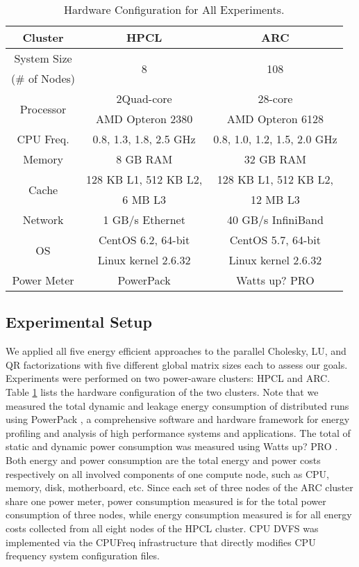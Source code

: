 \documentclass[12pt]{elsarticle}
\begin{document}
\begin{table}[h]
\scriptsize \centering
\caption{Hardware Configuration for All Experiments.}
\label{hardware_configuration}
\begin{tabular}{|c|c|c|}
\hline
Cluster & HPCL & ARC\\
\hline
System Size & \multirow{2}{*}{8} & \multirow{2}{*}{108}\\
(\# of Nodes) & &\\
\hline
\multirow{2}{*}{Processor} & 2Quad-core & 28-core\\
& AMD Opteron 2380 & AMD Opteron 6128\\
\hline
CPU Freq. & 0.8, 1.3, 1.8, 2.5 GHz & 0.8, 1.0, 1.2, 1.5, 2.0 GHz\\
\hline
Memory & 8 GB RAM & 32 GB RAM\\
\hline
\multirow{2}{*}{Cache} & 128 KB L1, 512 KB L2, & 128 KB L1, 512 KB L2,\\
& 6 MB L3 & 12 MB L3\\
\hline
Network & 1 GB/s Ethernet & 40 GB/s InfiniBand\\
\hline
\multirow{2}{*}{OS} & CentOS 6.2, 64-bit & CentOS 5.7, 64-bit\\
& Linux kernel 2.6.32 & Linux kernel 2.6.32\\
\hline
Power Meter & PowerPack & Watts up? PRO\\
\hline
\end{tabular}
\normalsize
\end{table}

\subsection{Experimental Setup}

We applied all five energy efficient approaches to the parallel Cholesky, LU, and QR factorizations with five different global matrix sizes each to assess our goals. Experiments were performed on two power-aware clusters: HPCL and ARC. Table \ref{hardware_configuration} lists the hardware configuration of the two clusters. Note that we measured the total dynamic and leakage energy consumption of distributed runs using PowerPack \cite{tpds10}, a comprehensive software and hardware framework for energy profiling and analysis of high performance systems and applications. The total of static and dynamic power consumption was measured using Watts up? PRO \cite{wattsup}. Both energy and power consumption are the total energy and power costs respectively on all involved components of one compute node, such as CPU, memory, disk, motherboard, etc. Since each set of three nodes of the ARC cluster share one power meter, power consumption measured is for the total power consumption of three nodes, while energy consumption measured is for all energy costs collected from all eight nodes of the HPCL cluster. CPU DVFS was implemented via the CPUFreq infrastructure \cite{cpufreq} that directly modifies CPU frequency system configuration files.
\end{document}
